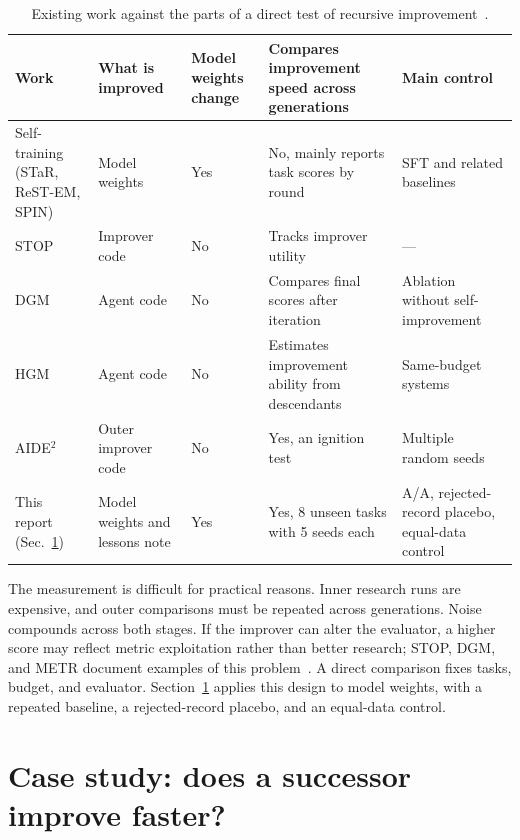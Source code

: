 \documentclass{article}
\begin{document}
\begin{table}[t]
  \caption{Existing work against the parts of a direct test of recursive improvement~\cite{M-14,M-17,M-20,M-01,M-03,M-04,E-25,E-27,E-28}\cite[\S4--6]{lit-rsi-academic-md}.}
  \label{tab:works}
  \centering
  \footnotesize
  \setlength{\tabcolsep}{4pt}
  \begin{tabular}{@{}>{\raggedright\arraybackslash}p{2.4cm}>{\raggedright\arraybackslash}p{2.4cm}>{\raggedright\arraybackslash}p{1.5cm}>{\raggedright\arraybackslash}p{3.7cm}>{\raggedright\arraybackslash}p{2.8cm}@{}}
    \toprule
    Work & What is improved & Model weights change & Compares improvement speed across generations & Main control \\
    \midrule
    Self-training (STaR, ReST-EM, SPIN) & Model weights & Yes & No, mainly reports task scores by round & SFT and related baselines \\
    STOP & Improver code & No & Tracks improver utility & --- \\
    DGM & Agent code & No & Compares final scores after iteration & Ablation without self-improvement \\
    HGM & Agent code & No & Estimates improvement ability from descendants & Same-budget systems \\
    AIDE$^2$ & Outer improver code & No & Yes, an ignition test & Multiple random seeds \\
    This report (Sec.~\ref{sec:exp}) & Model weights and lessons note & Yes & Yes, 8 unseen tasks with 5 seeds each & A/A, rejected-record placebo, equal-data control \\
    \bottomrule
  \end{tabular}
\end{table}

The measurement is difficult for practical reasons. Inner research runs are expensive, and outer comparisons must be repeated across generations. Noise compounds across both stages. If the improver can alter the evaluator, a higher score may reflect metric exploitation rather than better research; STOP, DGM, and METR document examples of this problem~\cite{E-25,M-03,E-33}. A direct comparison fixes tasks, budget, and evaluator. Section~\ref{sec:exp} applies this design to model weights, with a repeated baseline, a rejected-record placebo, and an equal-data control.

\section{Case study: does a successor improve faster?}
\label{sec:exp}
\end{document}
